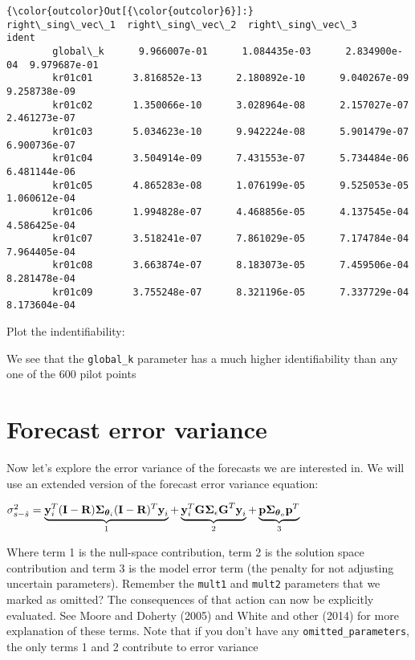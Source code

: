 \documentclass{article}
\begin{document}
            \begin{Verbatim}[commandchars=\\\{\}]
{\color{outcolor}Out[{\color{outcolor}6}]:}           right\_sing\_vec\_1  right\_sing\_vec\_2  right\_sing\_vec\_3         ident
        global\_k      9.966007e-01      1.084435e-03      2.834900e-04  9.979687e-01
        kr01c01       3.816852e-13      2.180892e-10      9.040267e-09  9.258738e-09
        kr01c02       1.350066e-10      3.028964e-08      2.157027e-07  2.461273e-07
        kr01c03       5.034623e-10      9.942224e-08      5.901479e-07  6.900736e-07
        kr01c04       3.504914e-09      7.431553e-07      5.734484e-06  6.481144e-06
        kr01c05       4.865283e-08      1.076199e-05      9.525053e-05  1.060612e-04
        kr01c06       1.994828e-07      4.468856e-05      4.137545e-04  4.586425e-04
        kr01c07       3.518241e-07      7.861029e-05      7.174784e-04  7.964405e-04
        kr01c08       3.663874e-07      8.183073e-05      7.459506e-04  8.281478e-04
        kr01c09       3.755248e-07      8.321196e-05      7.337729e-04  8.173604e-04
\end{Verbatim}
        
    Plot the indentifiability:

    We see that the \texttt{global\_k} parameter has a much higher
identifiability than any one of the 600 pilot points

    \section{Forecast error variance}\label{forecast-error-variance}

Now let's explore the error variance of the forecasts we are interested
in. We will use an extended version of the forecast error variance
equation:

\(\sigma_{s - \hat{s}}^2 = \underbrace{\textbf{y}_i^T({\bf{I}} - {\textbf{R}})\boldsymbol{\Sigma}_{{\boldsymbol{\theta}}_i}({\textbf{I}} - {\textbf{R}})^T\textbf{y}_i}_{1} + \underbrace{{\textbf{y}}_i^T{\bf{G}}\boldsymbol{\Sigma}_{\mathbf{\epsilon}}{\textbf{G}}^T{\textbf{y}}_i}_{2} + \underbrace{{\bf{p}}\boldsymbol{\Sigma}_{{\boldsymbol{\theta}}_o}{\bf{p}}^T}_{3}\)

Where term 1 is the null-space contribution, term 2 is the solution
space contribution and term 3 is the model error term (the penalty for
not adjusting uncertain parameters). Remember the \texttt{mult1} and
\texttt{mult2} parameters that we marked as omitted? The consequences of
that action can now be explicitly evaluated. See Moore and Doherty
(2005) and White and other (2014) for more explanation of these terms.
Note that if you don't have any \texttt{omitted\_parameters}, the only
terms 1 and 2 contribute to error variance
\end{document}
